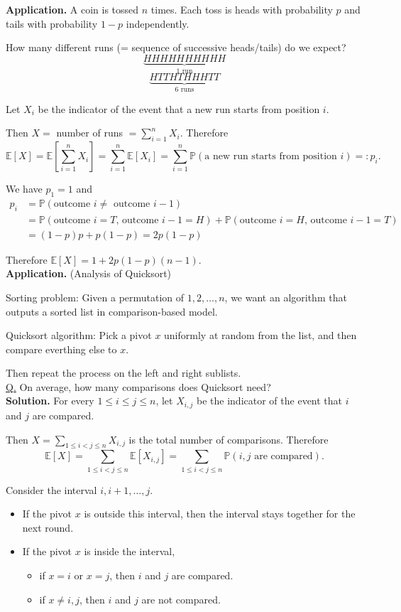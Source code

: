 \documentclass[a4paper,11pt]{amsbook}
\theoremstyle{definition}
\theoremstyle{remark}
\newcommand{\E}{\mathbb{E}}
\renewcommand{\P}{\mathbb{P}}
\newcommand\0{\varnothing}
\begin{document}
    \noindent \textbf{Application.} A coin is tossed $n$ times. Each toss is heads with probability $p$ 
    and tails with probability $1-p$ independently.

    How many different runs (= sequence of successive heads/tails) do we expect?
    $$\underbrace{HHHHHHHHHH}_{\text{1 run}}$$
    $$\underbrace{HTTHTHHHTT}_{\text{6 runs}}$$

    Let $X_i$ be the indicator of the event that a new run starts from position $i$.

    Then $X=$ number of runs $=\sum_{i=1}^nX_i$. Therefore
    $$\E[X]=\E\left[\sum_{i=1}^nX_i\right]=\sum_{i=1}^n\E[X_i]=\sum_{i=1}^n\P(\text{a new run starts from position }i)=:p_i.$$
    
    We have $p_1=1$ and \begin{align*}
        p_i&=\P(\text{outcome $i\neq$ outcome }i-1) \\
        &=\P(\text{outcome $i=T$, outcome }i-1=H)+\P(\text{outcome $i=H$, outcome }i-1=T) \\
        &=(1-p)p+p(1-p)=2p(1-p)
    \end{align*}

    Therefore $\E[X]=1+2p(1-p)(n-1).$\\

    \noindent \textbf{Application.} (Analysis of Quicksort)

    Sorting problem: Given a permutation of $1,2,\ldots,n$, we want an algorithm that outputs a sorted list 
    in comparison-based model.

    Quicksort algorithm: Pick a pivot $x$ uniformly at random from the list,
    and then compare everthing else to $x$.

    Then repeat the process on the left and right sublists.\\
    \underline{Q.} On average, how many comparisons does Quicksort need?\\
    \textbf{Solution.} For every $1\leq i\leq j\leq n$, let $X_{i,j}$ be the indicator of the event that $i$ and $j$ are compared.

    Then $X=\sum_{1\leq i<j\leq n}X_{i,j}$ is the total number of comparisons.
    Therefore $$\E[X]=\sum_{1\leq i<j\leq n}\E[X_{i,j}]=\sum_{1\leq i<j\leq n}\P(i,j\text{ are compared}).$$

    Consider the interval $i,i+1,\ldots,j$. \begin{itemize}
        \item If the pivot $x$ is outside this interval, then the interval stays together for the next round.
        \item If the pivot $x$ is inside the interval, \begin{itemize}
            \item if $x=i$ or $x=j$, then $i$ and $j$ are compared.
            \item if $x\neq i,j$, then $i$ and $j$ are not compared.
        \end{itemize}
    \end{itemize}
\end{document}
